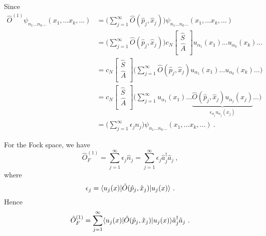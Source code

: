     Since 
    \begin{equation*}
    \begin{aligned}
        \hat O^{(1)} \psi_{n_1 \ldots n_k \ldots} (x_1, \ldots x_k, \ldots) & = \Big ( \sum_{j=1}^{\infty} \hat O(\hat p_j, \hat x_j) \Big) \psi_{n_1 \ldots n_k \ldots} (x_1, \ldots x_k, \ldots) \\ & = \Big ( \sum_{j=1}^{\infty} \hat O(\hat p_j, \hat x_j) \Big) c_N \begin{bmatrix} \hat S \\ \hat A \\ \end{bmatrix} u_{\alpha_1} (x_1) \ldots u_{\alpha_k} (x_k) \ldots \\ & = c_N \begin{bmatrix} \hat S \\ \hat A \\ \end{bmatrix} \Big ( \sum_{j=1}^{\infty} \hat O(\hat p_j, \hat x_j) u_{\alpha_1} (x_1) \ldots u_{\alpha_k} (x_k) \ldots \Big) \\ & = c_N \begin{bmatrix} \hat S \\ \hat A \\ \end{bmatrix} \Big ( \sum_{j=1}^{\infty}  u_{\alpha_1} (x_1) \ldots \underbrace{\hat O(\hat p_j, \hat x_j) u_{\alpha_j} (x_j)}_{\epsilon_{\alpha_j} u_{\alpha_j} (x_j) } \ldots \Big) \\ & = \Big (\sum_{j=1}^{\infty} \epsilon_j n_j \Big ) \psi_{n_1 \ldots n_k \ldots} (x_1, \ldots x_k, \ldots) ~.
    \end{aligned}
    \end{equation*}

    For the Fock space, we have 
    \begin{equation*}
        \hat O^{(1)}_F = \sum_{j=1}^{\infty} \epsilon_j \hat n_j = \sum_{j=1}^{\infty} \epsilon_j \hat a_j^\dagger \hat a_j ~,
    \end{equation*}
    where 
    \begin{equation*}
        \epsilon_j = \langle u_j (x)\vert \hat O (\hat p_j, \hat x_j) \vert u_j(x)\rangle ~.
    \end{equation*}
    Hence 
    \begin{equation*}
        \hat O^{(1)}_F = \sum_{j=1}^{\infty} \langle u_j (x)\vert \hat O (\hat p_j, \hat x_j) \vert u_j(x)\rangle \hat a_j^\dagger \hat a_j ~.
    \end{equation*}

